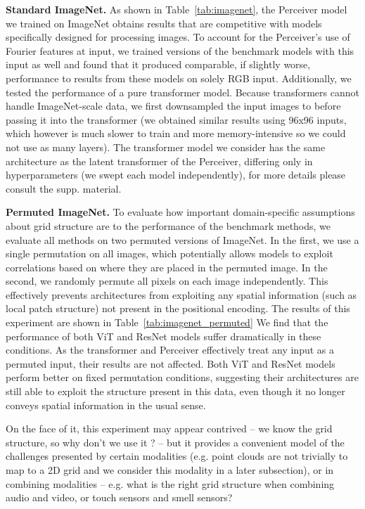 \documentclass{article}
\begin{document}
\noindent \textbf{Standard ImageNet.} As shown in Table~\ref{tab:imagenet}, the Perceiver model we trained on ImageNet obtains results that are competitive with models specifically designed for processing images. To account for the Perceiver's use of Fourier features at input, we trained versions of the benchmark models with this input as well and found that it produced comparable, if slightly worse, performance to results from these models on solely RGB input. Additionally, we tested the performance of a pure transformer model. Because transformers cannot handle ImageNet-scale data, we first downsampled the input images to  before passing it into the transformer (we obtained similar results using 96x96 inputs, which however is much slower to train and more memory-intensive so we could not use as many layers). The transformer model we consider has the same architecture as the latent transformer of the Perceiver, differing only in hyperparameters (we swept each model independently), for more details please consult the supp. material.

\noindent \textbf{Permuted ImageNet.} To evaluate how important domain-specific assumptions about grid structure are to the performance of the benchmark methods, we evaluate all methods on two permuted versions of ImageNet. In the first, we use a single permutation on all images, which potentially allows models to exploit correlations based on where they are placed in the permuted image. In the second, we randomly permute all pixels on each image independently. This effectively prevents architectures from exploiting any spatial information  (such as local patch structure) not present in the positional encoding. The results of this experiment are shown in Table~\ref{tab:imagenet_permuted} We find that the performance of both ViT and ResNet models suffer dramatically in these conditions. As the transformer and Perceiver effectively treat any input as a permuted input, their results are not affected. Both ViT and ResNet models perform better on fixed permutation conditions, suggesting their architectures are still able to exploit the structure present in this data, even though it no longer conveys spatial information in the usual sense. 

On the face of it, this experiment may appear contrived -- we know the grid structure, so why don't we use it ? --  but it provides a convenient model of the challenges presented by certain modalities (e.g. point clouds are not trivially to map to a 2D grid and we consider this modality in a later subsection), or in combining modalities -- e.g. what is the right grid structure when combining audio and video, or touch sensors and smell sensors?
\end{document}
